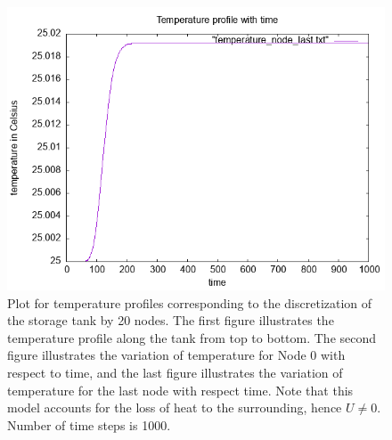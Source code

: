 \documentclass{article}
\begin{document}
\begin{figure}[ht]
\includegraphics[scale =0.5]{temperature_node_last_N_20.png}
\caption{Plot for temperature profiles corresponding to the discretization of the storage tank by 20 nodes. The first figure illustrates the temperature profile along the tank from top to bottom. The second figure illustrates the variation of temperature for Node 0 with respect to time, and the last figure illustrates the variation of temperature for the last node with respect time. Note that this model accounts for the loss of heat to the surrounding, hence $U \neq 0$. Number of time steps is 1000.}
\end{figure}
\end{document}
